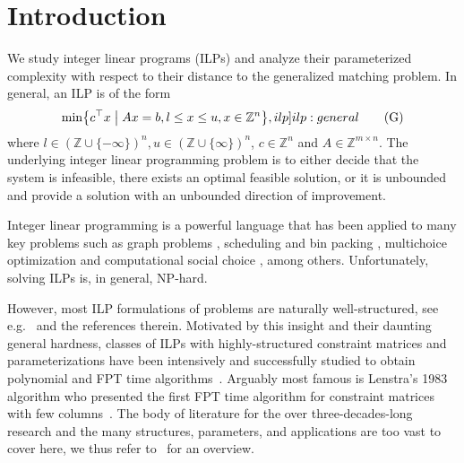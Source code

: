\documentclass[a4paper,UKenglish,cleveref,thm-restate]{lipics-v2021}
\newcommand{\Z}{\mathbb Z}
\begin{document}
\section{Introduction}\label{sec:Intro}

We study integer linear programs (ILPs) and analyze their parameterized complexity with respect to their distance to the generalized matching problem. In general, an ILP is of the form
\begin{equation}
    \min\bigl\{c^\top x\bigm\vert Ax=b,l\le x\le u,x\in\Z^n\bigr\},
    \label[ilp]{ilp:general}\tag{G}
\end{equation}
where $l\in(\Z\cup\{-\infty\})^n,u\in(\Z\cup\{\infty\})^n$, $c\in\Z^n$ and $A\in\Z^{m\times n}$. The underlying integer linear programming problem is to either decide that the system is infeasible, there exists an optimal feasible solution, or it is unbounded and provide a solution with an unbounded direction of improvement.

Integer linear programming is a powerful language that has been applied to many key problems such as graph problems \cite{DBLP:conf/isaac/FellowsLMRS08,DBLP:journals/dam/FialaGKKK18}, scheduling and bin packing \cite{DBLP:journals/jacm/GoemansR20,DBLP:journals/mp/JansenKMR22}, multichoice optimization \cite{ermolieva2023connections} and computational social choice \cite{bartholdi1989voting,DBLP:journals/teco/KnopKM20}, among others. Unfortunately, solving ILPs is, in general, NP-hard. 

However, most ILP formulations of problems are naturally well-structured, see e.g.~\cite{DBLP:conf/isaac/FellowsLMRS08,DBLP:journals/jacm/GoemansR20,DBLP:journals/algorithmica/GrammNR03,DBLP:journals/mp/JansenKMR22,DBLP:journals/teco/KnopKM20} and the references therein. Motivated by this insight and their daunting general hardness, classes of ILPs with highly-structured constraint matrices and parameterizations have been intensively and successfully studied to obtain polynomial and FPT time algorithms~\cite{DBLP:conf/isaac/FellowsLMRS08,DBLP:journals/jacm/GoemansR20,DBLP:journals/algorithmica/GrammNR03,DBLP:journals/mp/JansenKMR22,DBLP:journals/teco/KnopKM20}. Arguably most famous is Lenstra's 1983 algorithm who presented the first FPT time algorithm for constraint matrices with few columns~\cite{DBLP:journals/mor/Lenstra83}. The body of literature for the over three-decades-long research and the many structures, parameters, and applications are too vast to cover here, we thus refer to~\cite{GavenciakKK22} for an overview.
\end{document}
